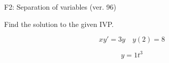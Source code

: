 \begin{exercise}
  \begin{exerciseTitle}F2: Separation of variables (ver. 96)\end{exerciseTitle}
  \begin{exerciseStatement}
    
Find the solution to the given IVP.

    
\[xy'= 3 y \hspace{1em} y( 2 ) = 8\]

  \end{exerciseStatement}
  \begin{exerciseAnswer}
    
\[y= 1 t^ 3\]

  \end{exerciseAnswer}
\end{exercise}